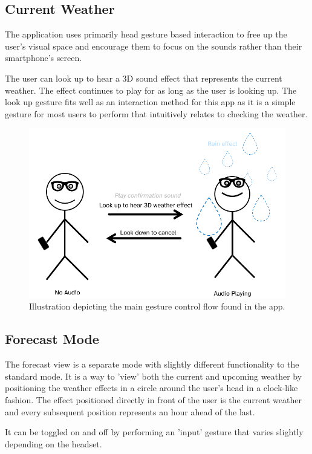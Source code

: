 \documentclass{l4proj}
\begin{document}
\subsection{Current Weather}

The application uses primarily head gesture based interaction to free up the user's visual space and encourage them to focus on the sounds rather than their smartphone's screen.

The user can look up to hear a 3D sound effect that represents the current weather. The effect continues to play for as long as the user is looking up. The look up gesture fits well as an interaction method for this app as it is a simple gesture for most users to perform that intuitively relates to checking the weather.

\begin{figure}[htb!]
    \centering
    \includegraphics[width=0.8\linewidth]{images/main_interaction_diagram.png}
    \caption{Illustration depicting the main gesture control flow found in the app.}
    \label{fig:main_interaction_diagraml}
\end{figure}

\subsection{Forecast Mode}

The forecast view is a separate mode with slightly different functionality to the standard mode. It is a way to 'view' both the current and upcoming weather by positioning the weather effects in a circle around the user's head in a clock-like fashion. The effect positioned directly in front of the user is the current weather and every subsequent position represents an hour ahead of the last.

It can be toggled on and off by performing an 'input' gesture that varies slightly depending on the headset.
\end{document}
